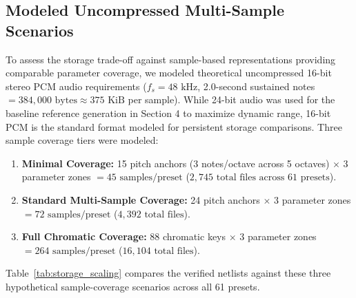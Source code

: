 \documentclass[fleqn,final]{jaes}
\begin{document}
\subsection{Modeled Uncompressed Multi-Sample Scenarios}
To assess the storage trade-off against sample-based representations providing comparable parameter coverage, we modeled theoretical uncompressed 16-bit stereo PCM audio requirements ($f_s = 48\text{ kHz}$, 2.0-second sustained notes $= 384,000\text{ bytes} \approx 375\text{ KiB}$ per sample). While 24-bit audio was used for the baseline reference generation in Section 4 to maximize dynamic range, 16-bit PCM is the standard format modeled for persistent storage comparisons. Three sample coverage tiers were modeled:
\begin{enumerate}
\item \textbf{Minimal Coverage:} 15 pitch anchors (3 notes/octave across 5 octaves) $\times$ 3 parameter zones $= 45\text{ samples/preset}$ ($2,745\text{ total files across 61 presets}$).
\item \textbf{Standard Multi-Sample Coverage:} 24 pitch anchors $\times$ 3 parameter zones $= 72\text{ samples/preset}$ ($4,392\text{ total files}$).
\item \textbf{Full Chromatic Coverage:} 88 chromatic keys $\times$ 3 parameter zones $= 264\text{ samples/preset}$ ($16,104\text{ total files}$).
\end{enumerate}

Table~\ref{tab:storage_scaling} compares the verified netlists against these three hypothetical sample-coverage scenarios across all 61 presets.

\begin{table}[t]
\caption{Storage Comparison: Verified MNA Netlists vs. Modeled Uncompressed PCM Sample-Bank Scenarios (All 61 Presets).}
\label{tab:storage_scaling}
\centering
{}
\end{table}
\end{document}
